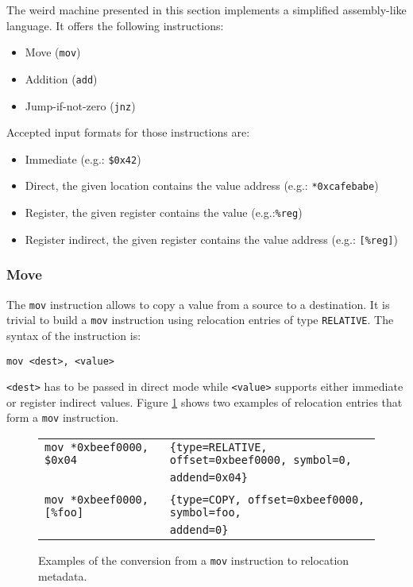\documentclass[11pt,twoside,a4paper]{article}
\begin{document}
The weird machine presented in this section implements a simplified assembly-like language. It offers the following instructions:
\begin{itemize}
\item Move (\texttt{mov})
\item Addition (\texttt{add})
\item Jump-if-not-zero (\texttt{jnz})
\end{itemize}

Accepted input formats for those instructions are:
\begin{itemize}
\item Immediate (e.g.: \texttt{\$0x42})
\item Direct, the given location contains the value address (e.g.: \texttt{*0xcafebabe})
\item Register, the given register contains the value (e.g.:\texttt{\%reg})
\item Register indirect, the given register contains the value address (e.g.: \texttt{[\%reg]})
\end{itemize}


\subsubsection{Move}
The \texttt{mov} instruction allows to copy a value from a source to a destination. It is trivial to build a \texttt{mov} instruction using relocation entries of type \texttt{RELATIVE}. The syntax of the instruction is:

\texttt{mov <dest>, <value>}

\texttt{<dest>} has to be passed in direct mode while \texttt{<value>} supports either immediate or register indirect values. Figure \ref{mov_table} shows two examples of relocation entries that form a \texttt{mov} instruction.

\begin{figure}
\begin{tabular}{ l | l }
  \hline
  \texttt{mov *0xbeef0000, \$0x04} & \texttt{\{type=RELATIVE, offset=0xbeef0000, symbol=0,} \\ &  \texttt{addend=0x04\}} \\
  \hline \\
  \texttt{mov *0xbeef0000, [\%foo]} & \texttt{\{type=COPY, offset=0xbeef0000, symbol=foo,} \\ & \texttt{addend=0\}} \\
  \hline
\end{tabular}
\caption{Examples of the conversion from a \texttt{mov} instruction to relocation metadata.}
\label{mov_table}
\end{figure}
\end{document}
